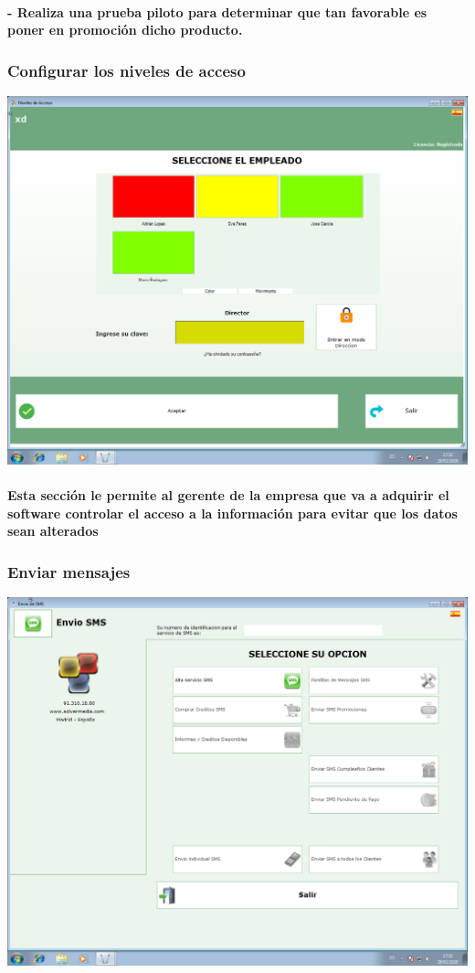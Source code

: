 \documentclass[12pt,a4paper]{article}
\begin{document}
\paragraph{- Realiza una prueba piloto para determinar que tan favorable es poner en promoción dicho producto.}

\subsubsection*{Configurar los niveles de acceso}
\includegraphics[scale=0.35]{Niveles de acceso.png}
\paragraph{Esta sección le permite al gerente de la empresa que va a adquirir el software controlar el acceso a la información para evitar que los datos sean alterados} 

\subsubsection*{Enviar mensajes}
\includegraphics[scale=0.35]{Envio SMS.png}
\end{document}

